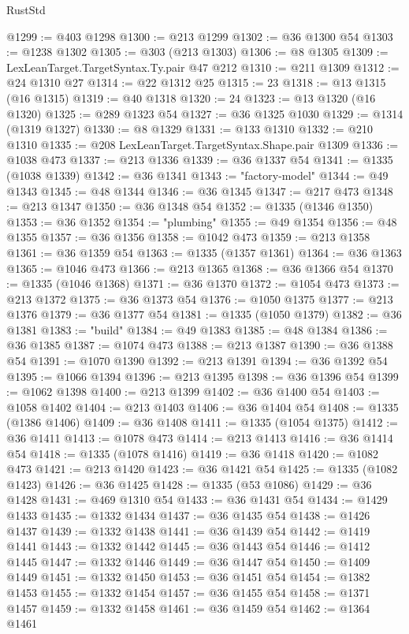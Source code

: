 \begin{lexlean}{RustStd}
\begin{coremodule}
@1299 := @403 @1298
@1300 := @213 @1299
@1302 := @36 @1300 @54
@1303 := @1238 @1302
@1305 := @303 (@213 @1303)
@1306 := @8 @1305
@1309 := LexLeanTarget.TargetSyntax.Ty.pair @47 @212
@1310 := @211 @1309
@1312 := @24 @1310 @27
@1314 := @22 @1312 @25
@1315 := 23
@1318 := @13 @1315 (@16 @1315)
@1319 := @40 @1318
@1320 := 24
@1323 := @13 @1320 (@16 @1320)
@1325 := @289 @1323 @54
@1327 := @36 @1325 @1030
@1329 := @1314 (@1319 @1327)
@1330 := @8 @1329
@1331 := @133 @1310
@1332 := @210 @1310
@1335 := @208 LexLeanTarget.TargetSyntax.Shape.pair @1309
@1336 := @1038 @473
@1337 := @213 @1336
@1339 := @36 @1337 @54
@1341 := @1335 (@1038 @1339)
@1342 := @36 @1341
@1343 := "factory-model"
@1344 := @49 @1343
@1345 := @48 @1344
@1346 := @36 @1345
@1347 := @217 @473
@1348 := @213 @1347
@1350 := @36 @1348 @54
@1352 := @1335 (@1346 @1350)
@1353 := @36 @1352
@1354 := "plumbing"
@1355 := @49 @1354
@1356 := @48 @1355
@1357 := @36 @1356
@1358 := @1042 @473
@1359 := @213 @1358
@1361 := @36 @1359 @54
@1363 := @1335 (@1357 @1361)
@1364 := @36 @1363
@1365 := @1046 @473
@1366 := @213 @1365
@1368 := @36 @1366 @54
@1370 := @1335 (@1046 @1368)
@1371 := @36 @1370
@1372 := @1054 @473
@1373 := @213 @1372
@1375 := @36 @1373 @54
@1376 := @1050 @1375
@1377 := @213 @1376
@1379 := @36 @1377 @54
@1381 := @1335 (@1050 @1379)
@1382 := @36 @1381
@1383 := "build"
@1384 := @49 @1383
@1385 := @48 @1384
@1386 := @36 @1385
@1387 := @1074 @473
@1388 := @213 @1387
@1390 := @36 @1388 @54
@1391 := @1070 @1390
@1392 := @213 @1391
@1394 := @36 @1392 @54
@1395 := @1066 @1394
@1396 := @213 @1395
@1398 := @36 @1396 @54
@1399 := @1062 @1398
@1400 := @213 @1399
@1402 := @36 @1400 @54
@1403 := @1058 @1402
@1404 := @213 @1403
@1406 := @36 @1404 @54
@1408 := @1335 (@1386 @1406)
@1409 := @36 @1408
@1411 := @1335 (@1054 @1375)
@1412 := @36 @1411
@1413 := @1078 @473
@1414 := @213 @1413
@1416 := @36 @1414 @54
@1418 := @1335 (@1078 @1416)
@1419 := @36 @1418
@1420 := @1082 @473
@1421 := @213 @1420
@1423 := @36 @1421 @54
@1425 := @1335 (@1082 @1423)
@1426 := @36 @1425
@1428 := @1335 (@53 @1086)
@1429 := @36 @1428
@1431 := @469 @1310 @54
@1433 := @36 @1431 @54
@1434 := @1429 @1433
@1435 := @1332 @1434
@1437 := @36 @1435 @54
@1438 := @1426 @1437
@1439 := @1332 @1438
@1441 := @36 @1439 @54
@1442 := @1419 @1441
@1443 := @1332 @1442
@1445 := @36 @1443 @54
@1446 := @1412 @1445
@1447 := @1332 @1446
@1449 := @36 @1447 @54
@1450 := @1409 @1449
@1451 := @1332 @1450
@1453 := @36 @1451 @54
@1454 := @1382 @1453
@1455 := @1332 @1454
@1457 := @36 @1455 @54
@1458 := @1371 @1457
@1459 := @1332 @1458
@1461 := @36 @1459 @54
@1462 := @1364 @1461

\end{coremodule}
\end{lexlean}
